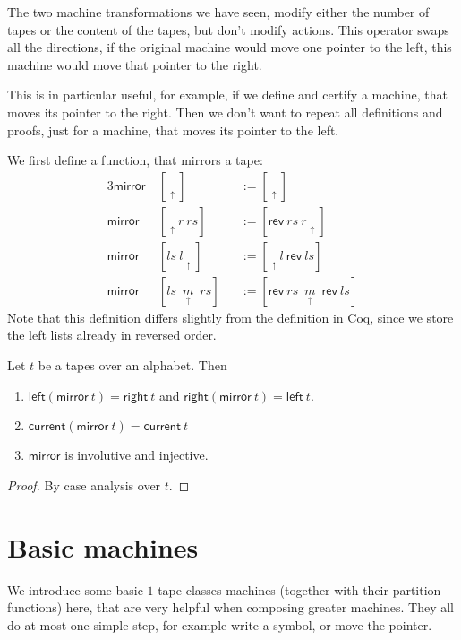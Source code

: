 \documentclass{psartcl}
\newcommand{\MS}[1]{\textsf{#1}}
\newcommand{\rev}{\MS{rev}}
\newcommand{\tape}[1]{[ #1 ]}
\newcommand{\tapePointer}[1]{\; \underset{\uparrow}{#1} \;}
\newcommand{\niltape}{\tape{\tapePointer{}}}
\newcommand{\midtape}[3]{\tape{#1 ~ \tapePointer{#2} ~ #3}}
\newcommand{\leftof}[2]{\tape{\tapePointer{} #1 ~ #2}}
\newcommand{\rightof}[2]{\tape{#1 ~ #2 \tapePointer{}}}
\begin{document}
The two machine transformations we have seen, modify either the number of tapes or the content of the tapes, but don't modify actions.
This operator swaps all the directions, if the original machine would move one pointer to the left, this machine would move that pointer to the right.

This is in particular useful, for example, if we define and certify a machine, that moves its pointer to the right.  Then we don't want to repeat all
definitions and proofs, just for a machine, that moves its pointer to the left.

We first define a function, that mirrors a tape:
\begin{alignat*}{3}
  \MS{mirror}&~\niltape            &&:= \niltape \\
  \MS{mirror}&~\leftof{r}{rs}      &&:= \rightof{\rev~rs}{r} \\
  \MS{mirror}&~\rightof{ls}{l}     &&:= \leftof{l}{\rev~ls} \\
  \MS{mirror}&~\midtape{ls}{m}{rs} &&:= \midtape{\rev~rs}{m}{\rev~ls}
\end{alignat*}
Note that this definition differs slightly from the definition in Coq, since we store the left lists already in reversed order.

\begin{lemma}[Correctnes of $\MS{mirror}$]
  \label{lem:mirror}
  Let $t$ be a tapes over an alphabet.  Then
  \begin{enumerate}
    \item $\MS{left} (\MS{mirror}~t) = \MS{right}~t$ and $\MS{right}(\MS{mirror}~t) = \MS{left} ~t$.
    \item $\MS{current}(\MS{mirror}~t) = \MS{current}~t$
    \item $\MS{mirror}$ is involutive and injective.
  \end{enumerate}
\end{lemma}
\begin{proof}
  By case analysis over $t$.
\end{proof}

\section{Basic machines}


We introduce some basic $1$-tape classes machines (together with their partition functions) here, that are very helpful when composing greater
machines.  They all do at most one simple step, for example write a symbol, or move the pointer.
\end{document}
